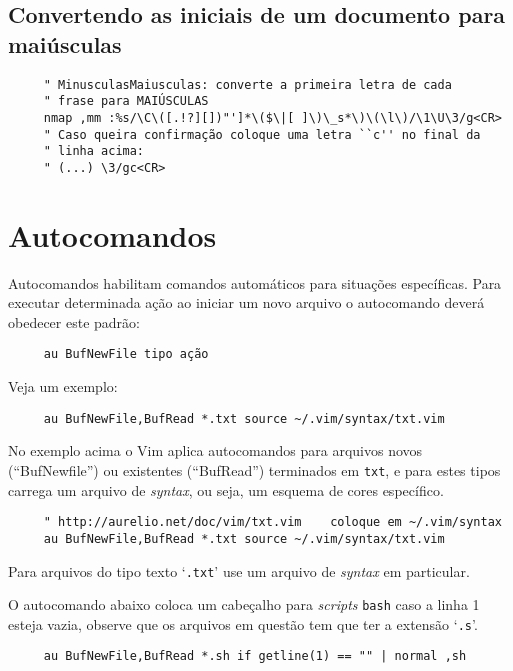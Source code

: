 \subsection{Convertendo as iniciais de um documento para maiúsculas}
\label{Convertendo as iniciais de um documento para maiúsculas}

\begin{verbatim}
     " MinusculasMaiusculas: converte a primeira letra de cada
     " frase para MAIÚSCULAS
     nmap ,mm :%s/\C\([.!?][])"']*\($\|[ ]\)\_s*\)\(\l\)/\1\U\3/g<CR>
     " Caso queira confirmação coloque uma letra ``c'' no final da 
     " linha acima:
     " (...) \3/gc<CR>
\end{verbatim}

\section{Autocomandos }
\label{Autocomandos }

Autocomandos habilitam comandos automáticos para situações
específicas. Para executar determinada ação ao
iniciar um novo arquivo o autocomando deverá obedecer este padrão:

\begin{verbatim}
     au BufNewFile tipo ação
\end{verbatim}

Veja um exemplo:

\begin{verbatim}
     au BufNewFile,BufRead *.txt source ~/.vim/syntax/txt.vim
\end{verbatim}

No exemplo acima o Vim aplica autocomandos para arquivos novos
(``BufNewfile'') ou existentes (``BufRead'') terminados em \verb|txt|, e para
estes tipos carrega um arquivo de {\em syntax}, ou seja, um esquema de cores
específico.

\begin{verbatim}
     " http://aurelio.net/doc/vim/txt.vim    coloque em ~/.vim/syntax
     au BufNewFile,BufRead *.txt source ~/.vim/syntax/txt.vim
\end{verbatim}

Para arquivos do tipo texto `{\tt *.txt}' use um arquivo de {\em syntax} em
particular.

O autocomando abaixo coloca um cabeçalho para {\em scripts} {\tt bash} caso a
linha 1 esteja vazia, observe que os arquivos em questão tem que ter a
extensão `{\tt .s}'.

\begin{verbatim}
     au BufNewFile,BufRead *.sh if getline(1) == "" | normal ,sh
\end{verbatim}

